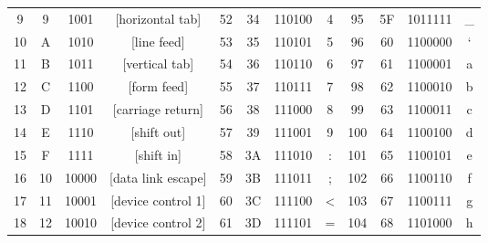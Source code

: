 {{\begin{tabular}{cccc|cccc|cccc}
{\color[HTML]{9400FF} 9} & 9 & {\color[HTML]{9400FF} 1001} & {[}horizontal tab{]} & {\color[HTML]{9400FF} 52} & 34 & {\color[HTML]{9400FF} 110100} & 4 & {\color[HTML]{9400FF} 95} & 5F & {\color[HTML]{9400FF} 1011111} & \_ \\
{\color[HTML]{9400FF} 10} & A & {\color[HTML]{9400FF} 1010} & {[}line feed{]} & {\color[HTML]{9400FF} 53} & 35 & {\color[HTML]{9400FF} 110101} & 5 & {\color[HTML]{9400FF} 96} & 60 & {\color[HTML]{9400FF} 1100000} & ` \\
{\color[HTML]{9400FF} 11} & B & {\color[HTML]{9400FF} 1011} & {[}vertical tab{]} & {\color[HTML]{9400FF} 54} & 36 & {\color[HTML]{9400FF} 110110} & 6 & {\color[HTML]{9400FF} 97} & 61 & {\color[HTML]{9400FF} 1100001} & a \\
{\color[HTML]{9400FF} 12} & C & {\color[HTML]{9400FF} 1100} & {[}form feed{]} & {\color[HTML]{9400FF} 55} & 37 & {\color[HTML]{9400FF} 110111} & 7 & {\color[HTML]{9400FF} 98} & 62 & {\color[HTML]{9400FF} 1100010} & b \\
{\color[HTML]{9400FF} 13} & D & {\color[HTML]{9400FF} 1101} & {[}carriage return{]} & {\color[HTML]{9400FF} 56} & 38 & {\color[HTML]{9400FF} 111000} & 8 & {\color[HTML]{9400FF} 99} & 63 & {\color[HTML]{9400FF} 1100011} & c \\
{\color[HTML]{9400FF} 14} & E & {\color[HTML]{9400FF} 1110} & {[}shift out{]} & {\color[HTML]{9400FF} 57} & 39 & {\color[HTML]{9400FF} 111001} & 9 & {\color[HTML]{9400FF} 100} & 64 & {\color[HTML]{9400FF} 1100100} & d \\
{\color[HTML]{9400FF} 15} & F & {\color[HTML]{9400FF} 1111} & {[}shift in{]} & {\color[HTML]{9400FF} 58} & 3A & {\color[HTML]{9400FF} 111010} & : & {\color[HTML]{9400FF} 101} & 65 & {\color[HTML]{9400FF} 1100101} & e \\
{\color[HTML]{9400FF} 16} & 10 & {\color[HTML]{9400FF} 10000} & {[}data link escape{]} & {\color[HTML]{9400FF} 59} & 3B & {\color[HTML]{9400FF} 111011} & ; & {\color[HTML]{9400FF} 102} & 66 & {\color[HTML]{9400FF} 1100110} & f \\
{\color[HTML]{9400FF} 17} & 11 & {\color[HTML]{9400FF} 10001} & {[}device control 1{]} & {\color[HTML]{9400FF} 60} & 3C & {\color[HTML]{9400FF} 111100} & \textless{} & {\color[HTML]{9400FF} 103} & 67 & {\color[HTML]{9400FF} 1100111} & g \\
{\color[HTML]{9400FF} 18} & 12 & {\color[HTML]{9400FF} 10010} & {[}device control 2{]} & {\color[HTML]{9400FF} 61} & 3D & {\color[HTML]{9400FF} 111101} & = & {\color[HTML]{9400FF} 104} & 68 & {\color[HTML]{9400FF} 1101000} & h \\

\end{tabular}}}
